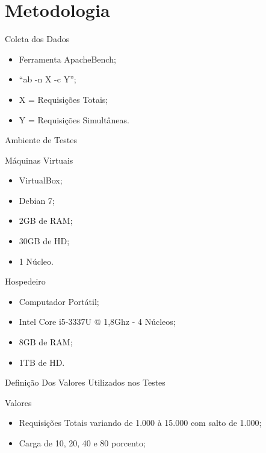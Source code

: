 \section{Metodologia}\label{sec:metodologia}

\begin{frame}{Coleta dos Dados}
	\begin{itemize}
		\item Ferramenta ApacheBench;
		\item ``ab -n X -c Y'';
		\item X = Requisições Totais;
		\item Y = Requisições Simultâneas.
	\end{itemize}
\end{frame}

\begin{frame}{Ambiente de Testes}
	\begin{block}{Máquinas Virtuais}
		\begin{itemize}
			\item VirtualBox;
			\item Debian 7;
			\item 2GB de RAM;
			\item 30GB de HD;
			\item 1 Núcleo.
		\end{itemize}
	\end{block} \pause
	\begin{block}{Hospedeiro}
		\begin{itemize}
			\item Computador Portátil;
			\item Intel Core i5-3337U @ 1,8Ghz - 4 Núcleos;
			\item 8GB de RAM;
			\item 1TB de HD.
		\end{itemize}
	\end{block}
\end{frame}

\begin{frame}{Definição Dos Valores Utilizados nos Testes}
	\begin{block}{Valores}
		\begin{itemize}
			\item Requisições Totais variando de 1.000 à 15.000 com salto de 
			1.000;
			\item Carga de 10, 20, 40 e 80 porcento;
		\end{itemize}
	\end{block}
\end{frame}

